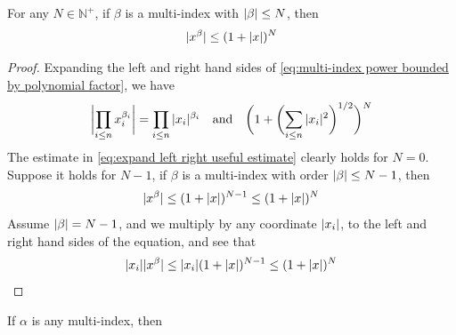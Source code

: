 \documentclass[../main-v2-manifolds.tex]{subfiles}
\begin{document}
\begin{note}
\begin{lemma}\label{lem:multi-index bounded by polynomial factor}
For any $N\in\mathbb{N}^+$, if $\beta$ is a multi-index with $\vert {\beta} \vert\leq N$, then
\begin{equation}
\vert {x^{\beta}} \vert \leq (1+\vert {x} \vert)^N
\label{eq:multi-index power bounded by polynomial factor}
\end{equation}
\end{lemma}
\begin{proof}
Expanding the left and right hand sides of \cref{eq:multi-index power bounded by polynomial factor}, we have
\begin{equation}
    \bigabs{\prod_{i\leq n} x_i^{\beta_i}} = \prod_{i\leq n} \abs{x_i}^{\beta_i}\qqtext{and}     \biggl( 1 + \biggl(\sum_{i\leq n}\abs{x_i} ^2\biggr)^{1/2}\biggr)^{N}
    \label{eq:expand left right useful estimate}
\end{equation}
The estimate in \cref{eq:expand left right useful estimate} clearly holds for $N=0$. Suppose it holds for $N-1$, if $\beta$ is a multi-index with order $\vert {\beta} \vert\leq N-1$, then
\[
\vert {x^{\beta}} \vert\leq (1+\vert {x} \vert)^{N-1}\leq (1+\vert {x} \vert)^N
\]
Assume $\vert {\beta} \vert = N-1$, and we multiply by any coordinate $\vert {x_i} \vert$, to the left and right hand sides of the equation, and see that 
\[
\vert {x_i} \vert\vert {x^{\beta}} \vert\leq \vert {x_i} \vert (1+\vert {x} \vert)^{N-1}\leq (1+\vert {x} \vert)^{N}
\]
\end{proof}
\begin{lemma}\label{lem:multi-index power bounded by sobolev factor}
If $\alpha$ is any multi-index, then


\end{lemma}
\end{note}
\end{document}
